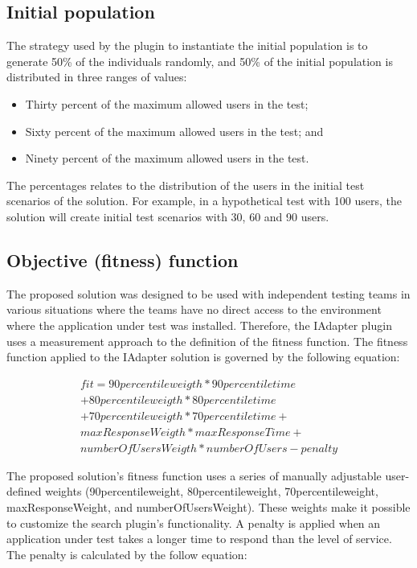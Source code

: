 \subsection{Initial population}

The strategy used by the plugin to instantiate the initial population is to generate 50\% of the individuals randomly, and 50\% of the initial population is distributed in three ranges of values:

\begin{itemize}
\item Thirty percent of the maximum allowed users in the test;
\item Sixty percent of the maximum allowed users in the test; and
\item Ninety percent of the maximum allowed users in the test.
\end{itemize}

The percentages relates to the distribution of the users in the initial test scenarios of the solution. For example, in a hypothetical test with 100 users, the solution will create initial test scenarios with 30, 60 and 90 users.

\subsection{Objective (fitness) function}

The proposed solution was designed to be used with independent testing teams in various situations where the teams have no direct access to the environment where the application under test was installed. Therefore, the IAdapter plugin uses a measurement approach to the definition of the fitness function. The fitness function applied to the IAdapter solution is governed by the following equation:

\begin{equation}
\begin{aligned}
fit=90percentileweigth* 90percentiletime\\
+80percentileweigth*80percentiletime\\+
70percentileweigth*70percentiletime+\\
maxResponseWeigth*maxResponseTime+\\
numberOfUsersWeigth*numberOfUsers-penalty
\end{aligned}
\end{equation}

The proposed solution's fitness function uses a series of manually adjustable user-defined weights (90percentileweight, 80percentileweight,  70percentileweight, maxResponseWeight, and numberOfUsersWeight). These weights make it possible to customize the search plugin's functionality. A penalty is applied when an application under test takes a longer time to respond than the level of service. The penalty is calculated by the follow equation:

